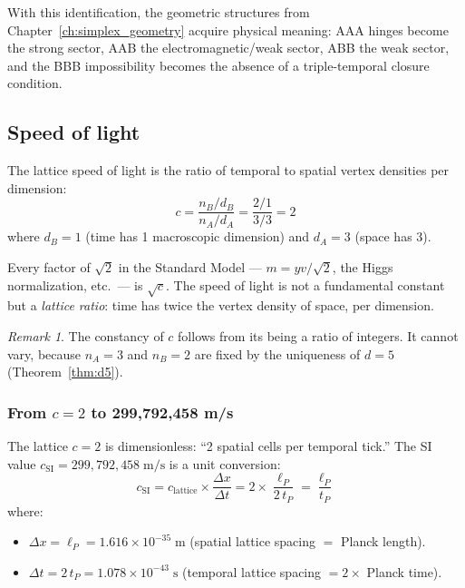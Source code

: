 \documentclass[12pt]{article}
\theoremstyle{remark}
\newtheorem{remark}[theorem]{Remark}
\theoremstyle{definition}
\begin{document}
With this identification, the geometric structures from Chapter~\ref{ch:simplex_geometry} acquire physical meaning: AAA hinges become the strong sector, AAB the electromagnetic/weak sector, ABB the weak sector, and the BBB impossibility becomes the absence of a triple-temporal closure condition.

\subsection{Speed of light}

The lattice speed of light is the ratio of temporal to spatial vertex densities per dimension:
\begin{equation}
\boxed{c = \frac{n_B / d_B}{n_A / d_A} = \frac{2/1}{3/3} = 2}
\label{eq:speed_of_light}
\end{equation}
where $d_B = 1$ (time has 1 macroscopic dimension) and $d_A = 3$ (space has 3).

Every factor of $\sqrt{2}$ in the Standard Model --- $m = yv/\sqrt{2}$, the Higgs normalization, etc.\ --- is $\sqrt{c}$. The speed of light is not a fundamental constant but a \emph{lattice ratio}: time has twice the vertex density of space, per dimension.

\begin{remark}
The constancy of $c$ follows from its being a ratio of integers. It cannot vary, because $n_A = 3$ and $n_B = 2$ are fixed by the uniqueness of $d = 5$ (Theorem~\ref{thm:d5}).
\end{remark}

\subsubsection{From $c = 2$ to 299{,}792{,}458 m/s}

The lattice $c = 2$ is dimensionless: ``2 spatial cells per temporal tick.'' The SI value $c_\text{SI} = 299{,}792{,}458\;\text{m/s}$ is a unit conversion:
\begin{equation}
c_\text{SI} = c_\text{lattice} \times \frac{\Delta x}{\Delta t} = 2 \times \frac{\ell_P}{2\,t_P} = \frac{\ell_P}{t_P}
\end{equation}
where:
\begin{itemize}
\item $\Delta x = \ell_P = 1.616 \times 10^{-35}\;\text{m}$ (spatial lattice spacing $=$ Planck length).
\item $\Delta t = 2\,t_P = 1.078 \times 10^{-43}\;\text{s}$ (temporal lattice spacing $= 2 \times$ Planck time).
\end{itemize}
\end{document}
